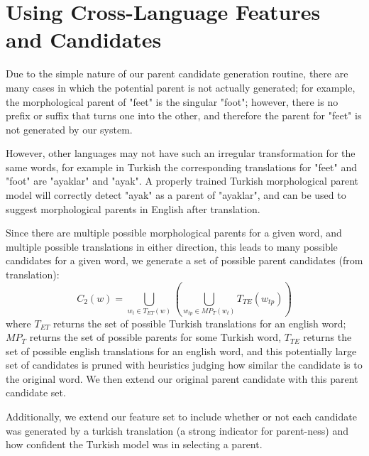 \documentclass[11pt,twocolumn]{article}
\begin{document}
\section{Using Cross-Language Features and Candidates}
Due to the simple nature of our parent candidate generation routine,
there are many cases in which the potential parent is not actually generated;
for example, the morphological parent of "feet" is the singular "foot";
however, there is no prefix or suffix that turns one into the other, and
therefore the parent for "feet" is not generated by our system.

However, other languages may not have such an irregular transformation
for the same words, for example in Turkish the corresponding translations
for "feet" and "foot" are "ayaklar" and "ayak". A properly trained Turkish
morphological parent model will correctly detect "ayak" as a parent of "ayaklar",
and can be used to suggest morphological parents in English after translation.

Since there are multiple possible morphological parents for a given word, and multiple
possible translations in either direction, this leads to many possible candidates for a given word,
we generate a set of possible parent candidates (from translation):
\begin{equation}
    C_2(w) = \bigcup_{w_t \in T_{ET}(w)}\left(\bigcup_{w_{tp} \in MP_T (w_t)} T_{TE}(w_{tp})\right)
\end{equation}
where $T_{ET}$ returns the set of possible Turkish translations
for an english word; $MP_T$ returns the set of possible parents for some Turkish word,
$T_{TE}$ returns the set of possible english translations for an english word,
and this potentially large set of candidates is pruned with heuristics judging
how similar the candidate is to the original word. We then extend our original parent candidate
with this parent candidate set.

Additionally, we extend our feature set to include whether or not each candidate was
generated by a turkish translation (a strong indicator for parent-ness) and how confident
the Turkish model was in selecting a parent.
\end{document}
